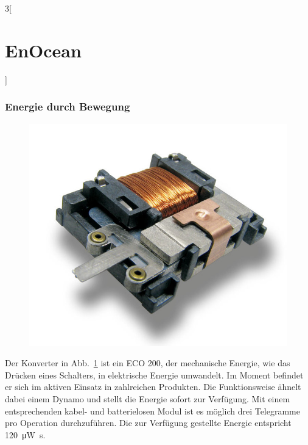 \begin{multicols}{3}[\section{EnOcean}]
\subsubsection*{Energie durch Bewegung}

\begin{figure}
  \vspace{-20pt}
  \begin{center}
  	\hspace{-20pt}
    \includegraphics[width=1\linewidth]{Kapitel/EnOcean/Grafiken/EnOceanECO200white.jpg}
    \label{fig:enocean.eco200}
  \end{center}
  \vspace{-15pt}
\end{figure}
Der Konverter in Abb.~\ref{fig:enocean.eco200} ist ein ECO 200, der mechanische Energie, wie das Drücken eines Schalters, in elektrische Energie umwandelt. Im Moment befindet er sich im aktiven Einsatz in zahlreichen Produkten. Die Funktionsweise ähnelt dabei einem Dynamo und stellt die Energie sofort zur Verfügung. Mit einem entsprechenden kabel- und batterielosen Modul ist es möglich drei Telegramme pro Operation durchzuführen. Die zur Verfügung gestellte Energie entspricht \SI{120}{\micro\watt\second}.~\cite{enocean.1}


\end{multicols}
